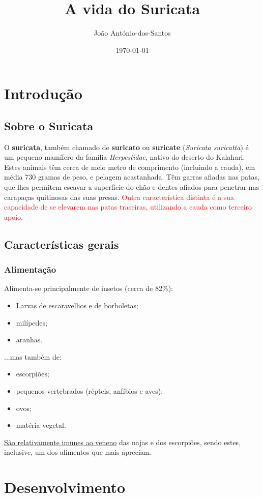 \documentclass[11pt, a4paper]{report}
\title{A vida do Suricata}
\author{João António-dos-Santos}
\date{\today}
\begin{document}
\maketitle
\chapter{Introdução}
\section{Sobre o Suricata}
O \textbf{suricata}, também chamado de \textbf{suricato} ou \textbf{suricate} (\textit{Suricata suricatta}) é um pequeno mamífero da família \textit{Herpestidae}, nativo do deserto
do Kalahari. Estes animais têm cerca de meio metro de comprimento
(incluindo a cauda), em média 730 gramas de peso, e pelagem acastanhada. Têm garras afiadas nas patas, que lhes permitem escavar a superfície do ch\~ao e dentes afiados para penetrar nas carapaças quitinosas das suas presas. \textcolor{red} {Outra característica distinta é a sua capacidade de
se elevarem nas patas traseiras, utilizando a cauda como terceiro apoio.}
\section{Características gerais}
\subsection{Alimentação}
Alimenta-se principalmente de insetos (cerca de 82\%):
\begin{itemize}
\item Larvas de escaravelhos e de borboletas;
\item milípedes;
\item aranhas.
\end{itemize}
...mas também de:
\begin{itemize}
\item escorpi\~oes;
\item pequenos vertebrados (répteis, anfíbios e aves);
\item ovos;
\item matéria vegetal.
\end{itemize}
\uline {S\~ao relativamente imunes ao veneno} das najas e dos
escorpi\~oes, sendo estes, inclusive, um dos alimentos que mais apreciam.

\chapter{Desenvolvimento}
\end{document}
